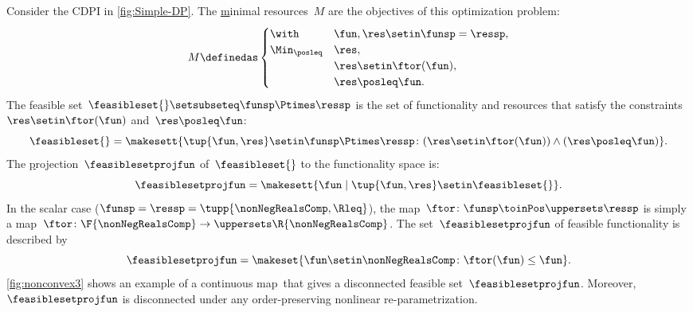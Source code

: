 \begin{example}
    \label{exa:one}
    Consider the CDPI in \cref{fig:Simple-DP}.
    The \uline{m}inimal resources~$M$ are the objectives of this optimization problem:
    \begin{equation}
        M\definedas
        \begin{cases}
            \with          & \fun,\res\setin\funsp=\ressp, \\
            \Min_{\posleq} & \res,                         \\
                           & \res\setin\ftor(\fun),        \\
                           & \res\posleq\fun.
        \end{cases}
    \end{equation}
    The feasible set~$\feasibleset{}\setsubseteq\funsp\Ptimes \ressp$ is the set of functionality and resources that satisfy the constraints~$\res\setin\ftor(\fun)$ and~$\res\posleq\fun$:
    \begin{equation}
        \feasibleset{}=\makesett{ \tup{\fun,\res}\setin\funsp\Ptimes \ressp\colon (\res\setin\ftor(\fun))\wedge(\res\posleq\fun)} .
        \label{eq:feasible}
    \end{equation}
    The \uline{p}rojection~$\feasiblesetprojfun$ of~$\feasibleset{}$ to the functionality space is:
    \begin{equation}
        \feasiblesetprojfun=\makesett{ \fun\mid\tup{\fun,\res} \setin\feasibleset{}}.
    \end{equation}
    In the scalar case ($\funsp=\ressp=\tupp{\nonNegRealsComp,\Rleq}$), the map~$\ftor\colon\funsp\toinPos\uppersets \ressp$ is simply a map~$\ftor\colon\F{\nonNegRealsComp}\to \uppersets\R{\nonNegRealsComp}$.
    The set~$\feasiblesetprojfun$ of feasible functionality is described by
    \begin{equation}
        \feasiblesetprojfun=\makeset{\fun\setin\nonNegRealsComp\colon \ftor(\fun)\leq\fun}.
        \label{eq:Pfeasible}
    \end{equation}
    \cref{fig:nonconvex3} shows an example of a continuous map~\ftor that gives a disconnected feasible set~$\feasiblesetprojfun$.
    Moreover,~$\feasiblesetprojfun$ is disconnected under any order-preserving nonlinear re-parametrization.

\end{example}
